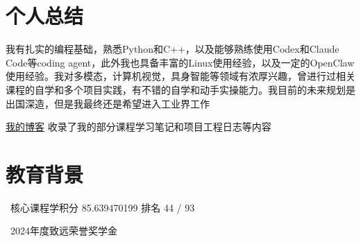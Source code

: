 \documentclass{resume}
\begin{document}



 
\section{个人总结}
我有扎实的编程基础，熟悉Python和C++，以及能够熟练使用Codex和Claude Code等coding agent，此外我也具备丰富的Linux使用经验，以及一定的OpenClaw使用经验。我对多模态，计算机视觉，具身智能等领域有浓厚兴趣，曾进行过相关课程的自学和多个项目实践，有不错的自学和动手实操能力。我目前的未来规划是出国深造，但是我最终还是希望进入工业界工作

\vspace{0.5ex}

\href{https://1ji0o.github.io/}{我的博客} 收录了我的部分课程学习笔记和项目工程日志等内容

\section{教育背景}
\ 核心课程学积分 85.639470199	   排名 44 / 93

\ 2024年度致远荣誉奖学金


\end{document}
